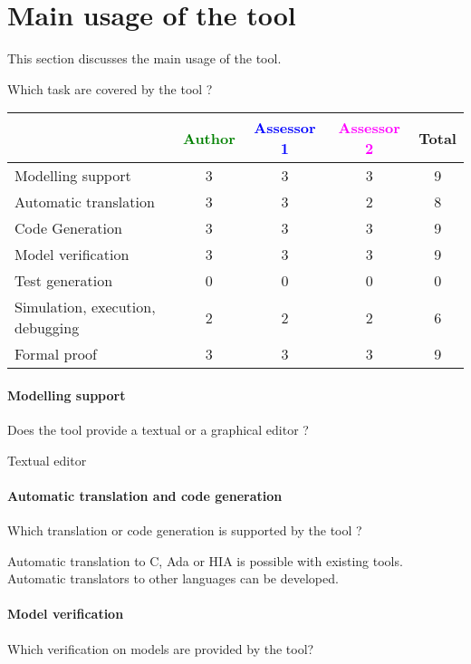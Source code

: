 \section{Main usage of the tool}
\label{main_usage}

This section discusses the main usage of the tool.

Which task are covered by the tool ?


\begin{tabular}{|l | c | c | c | c|}
\hline
& \textcolor{green}{Author} & \textcolor{blue}{Assessor 1} & \textcolor{magenta}{Assessor 2} & Total \\
\hline 
Modelling support & 3 & 3 & 3 & 9 \\
\hline
Automatic translation  & 3 & 3 & 2 & 8 \\
\hline
Code Generation  & 3 & 3 & 3 & 9 \\
\hline
Model verification & 3 & 3 & 3  & 9 \\
\hline
Test generation & 0 & 0 & 0& 0 \\
\hline
Simulation, execution, debugging & 2  & 2 & 2 & 6\\
\hline
Formal proof & 3 & 3 & 3 & 9 \\
\hline
\end{tabular}

\paragraph{Modelling support}
Does the tool provide a  textual or a graphical editor ?

\begin{author_comment}
Textual editor
\end{author_comment}

\paragraph{Automatic translation and code generation}
Which translation or code generation is supported by the tool ?

\begin{author_comment}
Automatic translation to  C, Ada or HIA is possible with existing tools. Automatic translators to other languages can be developed.
\end{author_comment}

\paragraph{Model verification}
Which verification on models are provided by the tool?

